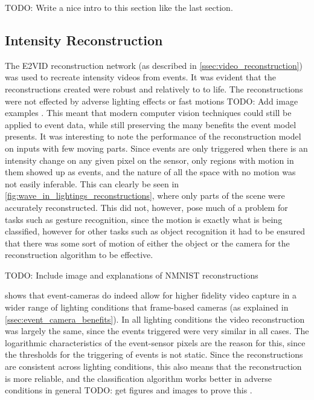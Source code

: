 \color{red} TODO: Write a nice intro to this section like the last section. \color{black}

\subsection{Intensity Reconstruction}

The E2VID reconstruction network (as described in \cref{ssec:video_reconstruction}) was used to recreate intensity videos from events. It was evident that the reconstructions created were robust and relatively to to life. The reconstructions were not effected by adverse lighting effects or fast motions \color{red} TODO: Add image examples \color{black}. This meant that modern computer vision techniques could still be applied to event data, while still preserving the many benefits the event model presents. It was interesting to note the performance of the reconstruction model on inputs with few moving parts. Since events are only triggered when there is an intensity change on any given pixel on the sensor, only regions with motion in them showed up as events, and the nature of all the space with no motion was not easily inferable. This can clearly be seen in \cref{fig:wave_in_lightings_reconstructions}, where only parts of the scene were accurately reconstructed. This did not, however, pose much of a problem for tasks such as gesture recognition, since the motion is exactly what is being classified, however for other tasks such as object recognition it had to be ensured that there was some sort of motion of either the object or the camera for the reconstruction algorithm to be effective.

\color{red} TODO: Include image and explanations of NMNIST reconstructions \color{black}

 shows that event-cameras do indeed allow for higher fidelity video capture in a wider range of lighting conditions that frame-based cameras (as explained in \cref{ssec:event_camera_benefits}). In all lighting conditions the video reconstruction was largely the same, since the events triggered were very similar in all cases. The logarithmic characteristics of the event-sensor pixels are the reason for this, since the thresholds for the triggering of events is not static. Since the reconstructions are consistent across lighting conditions, this also means that the reconstruction is more reliable, and the classification algorithm works better in adverse conditions in general \color{red} TODO: get figures and images to prove this \color{black}.

